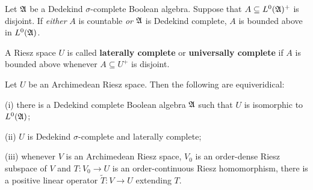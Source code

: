  Let $\frak A$ be a Dedekind $\sigma$-complete
Boolean algebra.
Suppose that $A\subseteq L^0(\frak A)^+$ is disjoint.   If {\it either}
$A$ is countable {\it or} $\frak A$ is Dedekind complete, 
$A$ is bounded above in $L^0(\frak A)$.


 A Riesz space $U$ is called {\bf laterally
complete} or {\bf universally complete} if $A$ is bounded above whenever
$A\subseteq U^+$ is disjoint.

 Let $U$ be an Archimedean Riesz space.   Then the
following are equiveridical:

(i) there is a Dedekind complete Boolean algebra $\frak A$ such that $U$
is isomorphic to $L^0(\frak A)$;

(ii) $U$ is Dedekind $\sigma$-complete and laterally complete;

(iii) whenever $V$ is an Archimedean Riesz space, $V_0$ is an
order-dense Riesz subspace of $V$ and $T:V_0\to U$ is an
order-continuous Riesz homomorphism, there is a positive linear operator
$\tilde T:V\to U$ extending $T$.

